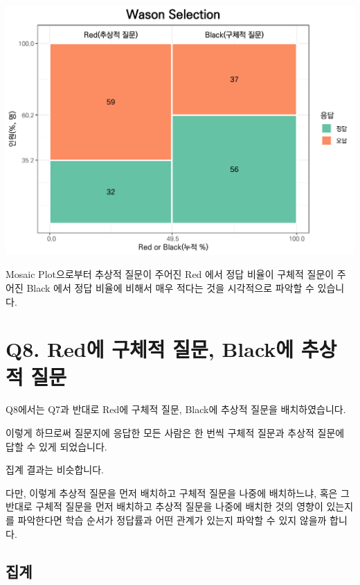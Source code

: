 \documentclass[
]{book}
\begin{document}
\includegraphics{_main_files/figure-latex/unnamed-chunk-194-1.pdf}

Mosaic Plot으로부터 추상적 질문이 주어진 Red 에서 정답 비율이 구체적 질문이 주어진 Black 에서 정답 비율에 비해서 매우 적다는 것을 시각적으로 파악할 수 있습니다.

\section{Q8. Red에 구체적 질문, Black에 추상적 질문}\label{q8.-reduxc5d0-uxad6cuxccb4uxc801-uxc9c8uxbb38-blackuxc5d0-uxcd94uxc0c1uxc801-uxc9c8uxbb38}

Q8에서는 Q7과 반대로 Red에 구체적 질문, Black에 추상적 질문을 배치하였습니다.

이렇게 하므로써 질문지에 응답한 모든 사람은 한 번씩 구체적 질문과 추상적 질문에 답할 수 있게 되었습니다.

집계 결과는 비슷합니다.

다만, 이렇게 추상적 질문을 먼저 배치하고 구체적 질문을 나중에 배치하느냐, 혹은 그 반대로 구체적 질문을 먼저 배치하고 추상적 질문을 나중에 배치한 것의 영향이 있는지를 파악한다면 학습 순서가 정답률과 어떤 관계가 있는지 파악할 수 있지 않을까 합니다.

\subsection{집계}\label{uxc9d1uxacc4-14}
\end{document}
